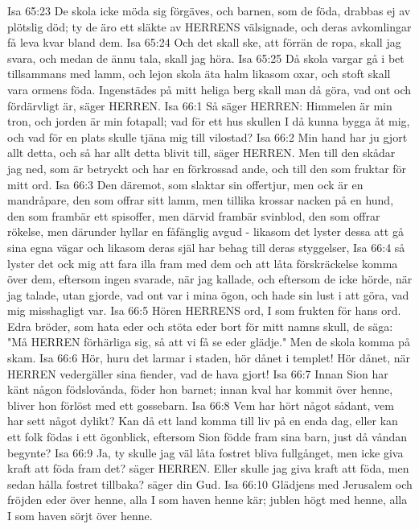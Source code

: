 Isa 65:23  De skola icke möda sig förgäves, och barnen, som de föda, drabbas ej av plötslig död; ty de äro ett släkte av HERRENS välsignade, och deras avkomlingar få leva kvar bland dem.
Isa 65:24  Och det skall ske, att förrän de ropa, skall jag svara, och medan de ännu tala, skall jag höra.
Isa 65:25  Då skola vargar gå i bet tillsammans med lamm, och lejon skola äta halm likasom oxar, och stoft skall vara ormens föda. Ingenstädes på mitt heliga berg skall man då göra, vad ont och fördärvligt är, säger HERREN.
Isa 66:1  Så säger HERREN: Himmelen är min tron, och jorden är min fotapall; vad för ett hus skullen I då kunna bygga åt mig, och vad för en plats skulle tjäna mig till vilostad?
Isa 66:2  Min hand har ju gjort allt detta, och så har allt detta blivit till, säger HERREN. Men till den skådar jag ned, som är betryckt och har en förkrossad ande, och till den som fruktar för mitt ord.
Isa 66:3  Den däremot, som slaktar sin offertjur, men ock är en mandråpare, den som offrar sitt lamm, men tillika krossar nacken på en hund, den som frambär ett spisoffer, men därvid frambär svinblod, den som offrar rökelse, men därunder hyllar en fåfänglig avgud - likasom det lyster dessa att gå sina egna vägar och likasom deras själ har behag till deras styggelser,
Isa 66:4  så lyster det ock mig att fara illa fram med dem och att låta förskräckelse komma över dem, eftersom ingen svarade, när jag kallade, och eftersom de icke hörde, när jag talade, utan gjorde, vad ont var i mina ögon, och hade sin lust i att göra, vad mig misshagligt var.
Isa 66:5  Hören HERRENS ord, I som frukten för hans ord. Edra bröder, som hata eder och stöta eder bort för mitt namns skull, de säga: "Må HERREN förhärliga sig, så att vi få se eder glädje." Men de skola komma på skam.
Isa 66:6  Hör, huru det larmar i staden, hör dånet i templet! Hör dånet, när HERREN vedergäller sina fiender, vad de hava gjort!
Isa 66:7  Innan Sion har känt någon födslovånda, föder hon barnet; innan kval har kommit över henne, bliver hon förlöst med ett gossebarn.
Isa 66:8  Vem har hört något sådant, vem har sett något dylikt? Kan då ett land komma till liv på en enda dag, eller kan ett folk födas i ett ögonblick, eftersom Sion födde fram sina barn, just då våndan begynte?
Isa 66:9  Ja, ty skulle jag väl låta fostret bliva fullgånget, men icke giva kraft att föda fram det? säger HERREN. Eller skulle jag giva kraft att föda, men sedan hålla fostret tillbaka? säger din Gud.
Isa 66:10  Glädjens med Jerusalem och fröjden eder över henne, alla I som haven henne kär; jublen högt med henne, alla I som haven sörjt över henne.

